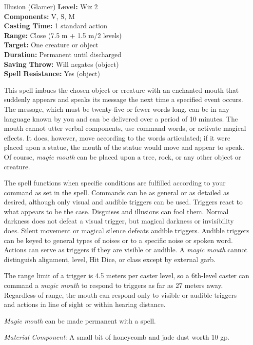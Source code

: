 {Illusion (Glamer)}
{
	\textbf{Level:}
	Wiz 2\\
	\textbf{Components:}
	V, S, M\\
	\textbf{Casting Time:}
	1 standard action\\
	\textbf{Range:}
	Close (7.5 m + 1.5 m/2 levels)\\
	\textbf{Target:}
	One creature or object\\
	\textbf{Duration:}
	Permanent until discharged\\
	\textbf{Saving Throw:}
	Will negates (object)\\
	\textbf{Spell Resistance:}
	Yes (object)\\
}
{
	This spell imbues the chosen object or creature with an enchanted mouth that suddenly appears and speaks its message the next time a specified event occurs. The message, which must be twenty-five or fewer words long, can be in any language known by you and can be delivered over a period of 10 minutes. The mouth cannot utter verbal components, use command words, or activate magical effects. It does, however, move according to the words articulated; if it were placed upon a statue, the mouth of the statue would move and appear to speak. Of course, \emph{magic mouth} can be placed upon a tree, rock, or any other object or creature.

	The spell functions when specific conditions are fulfilled according to your command as set in the spell. Commands can be as general or as detailed as desired, although only visual and audible triggers can be used. Triggers react to what appears to be the case. Disguises and illusions can fool them. Normal darkness does not defeat a visual trigger, but magical darkness or invisibility does. Silent movement or magical silence defeats audible triggers. Audible triggers can be keyed to general types of noises or to a specific noise or spoken word. Actions can serve as triggers if they are visible or audible. A \emph{magic mouth} cannot distinguish alignment, level, Hit Dice, or class except by external garb.

	The range limit of a trigger is 4.5 meters per caster level, so a 6th-level caster can command a \emph{magic mouth} to respond to triggers as far as 27 meters away. Regardless of range, the mouth can respond only to visible or audible triggers and actions in line of sight or within hearing distance.

	\emph{Magic mouth} can be made permanent with a  spell.

	\textit{Material Component}:
	A small bit of honeycomb and jade dust worth 10 gp.

}
